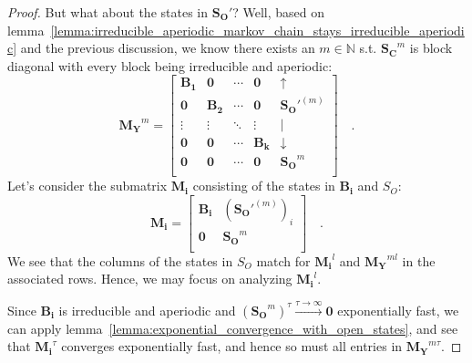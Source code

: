 \documentclass[../../main.tex]{subfiles}
\begin{document}
\begin{proof}
        But what about the states in $\bm{S_O}'$? Well, based on lemma~\ref{lemma:irreducible_aperiodic_markov_chain_stays_irreducible_aperiodic} and the previous discussion, we know there exists an $m \in \mathbb{N}$ s.t. $\bm{S_C}^m$ is block diagonal with every block being irreducible and aperiodic:
        \[
            \bm{M_Y}^m = 
            \begin{bmatrix}
            \bm{B_1} & \bm{0} & \cdots & \bm{0} & \uparrow \\
            \bm{0} & \bm{B_2} & \cdots & \bm{0} & \bm{S_O}'^{(m)} \\
            \vdots & \vdots & \ddots & \vdots & \mid \\
            \bm{0} & \bm{0} & \cdots & \bm{B_k} & \downarrow \\
            \bm{0} & \bm{0} & \cdots & \bm{0} & \bm{S_O}^{m} \\
            \end{bmatrix}
            \quad .
        \]
        Let's consider the submatrix $\bm{M_i}$ consisting of the states in $\bm{B_i}$ and $S_O$:
        \[
            \bm{M_i} = 
            \begin{bmatrix}
            \bm{B_i} & (\bm{S_O}'^{(m)})_i \\
            \bm{0} & \bm{S_O}^{m} \\
            \end{bmatrix}
            \quad .
        \]
        We see that the columns of the states in $S_O$ match for $\bm{M_i}^l$ and $\bm{M_Y}^{ml}$ in the associated rows. Hence, we may focus on analyzing $\bm{M_i}^l$.

        Since $\bm{B_i}$ is irreducible and aperiodic and $(\bm{S_O}^{m})^\tau \xrightarrow{\tau \to \infty} \bm{0}$ exponentially fast, we can apply lemma~\ref{lemma:exponential_convergence_with_open_states}, and see that $\bm{M_i}^\tau$ converges exponentially fast, and hence so must all entries in $\bm{M_Y}^{m \tau}$.
    \end{proof}
\end{document}

